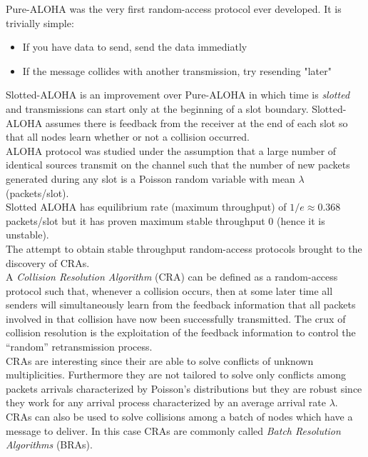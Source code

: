 \documentclass[11pt,a4paper,twoside,openright]{book}
\begin{document}
Pure-ALOHA was the very first random-access protocol ever developed. It is trivially simple:
\begin{itemize}
\item If you have data to send, send the data immediatly
\item If the message collides with another transmission, try resending "later"
\end{itemize}
Slotted-ALOHA is an improvement over Pure-ALOHA in which time is \emph{slotted} and transmissions can start only at the beginning of a slot boundary. Slotted-ALOHA assumes there is feedback from the receiver at the end of each slot so that all nodes learn whether or not a collision occurred.\\
ALOHA protocol was studied under the assumption that a large number of identical sources transmit on the channel such that the number of new packets generated during any slot is a Poisson random variable with mean $\lambda$ (packets/slot).\\
Slotted ALOHA has equilibrium rate (maximum throughput) of $1/e\approx 0.368$ packets/slot but it has proven maximum stable throughput 0 (hence it is unstable).\\
The attempt to obtain stable throughput random-access protocols brought to the discovery of CRAs.\\

A \emph{Collision Resolution Algorithm} (CRA) can be defined as a random-access protocol such that, whenever a collision occurs, then at some later time all senders will simultaneously learn from the feedback information that all packets involved in that collision have now been  successfully transmitted. The crux of collision resolution is the exploitation of the feedback information to control the ``random'' retransmission process.\\%

CRAs are interesting since their are able to solve conflicts of unknown multiplicities. Furthermore they are not tailored to solve only conflicts among packets arrivals characterized by Poisson's distributions but they are robust since they work for any arrival process characterized by an average arrival rate $\lambda$.\\

CRAs can also be used to solve collisions among a batch of nodes which have a message to deliver. In this case CRAs are commonly called \emph{Batch Resolution Algorithms} (BRAs).\\
\end{document}
